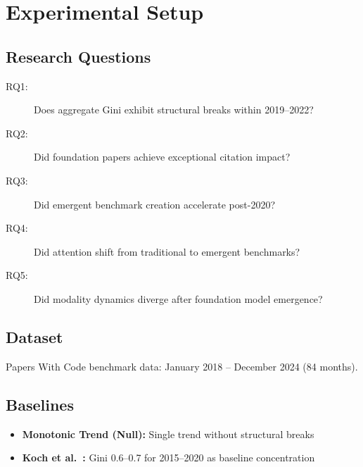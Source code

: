 \section{Experimental Setup}

\subsection{Research Questions}

\begin{description}
    \item[RQ1:] Does aggregate Gini exhibit structural breaks within 2019--2022?
    \item[RQ2:] Did foundation papers achieve exceptional citation impact?
    \item[RQ3:] Did emergent benchmark creation accelerate post-2020?
    \item[RQ4:] Did attention shift from traditional to emergent benchmarks?
    \item[RQ5:] Did modality dynamics diverge after foundation model emergence?
\end{description}

\subsection{Dataset}

Papers With Code benchmark data: January 2018 -- December 2024 (84 months).

\subsection{Baselines}

\begin{itemize}
    \item \textbf{Monotonic Trend (Null):} Single trend without structural breaks
    \item \textbf{Koch et al.~\cite{koch2021reduced}:} Gini 0.6--0.7 for 2015--2020 as baseline concentration
\end{itemize}
